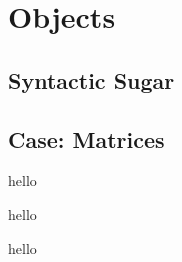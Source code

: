 \chapter{Objects}




\section{Syntactic Sugar}



\section{Case: Matrices}

\csharpsection{\csharp}
hello

hello

hello

